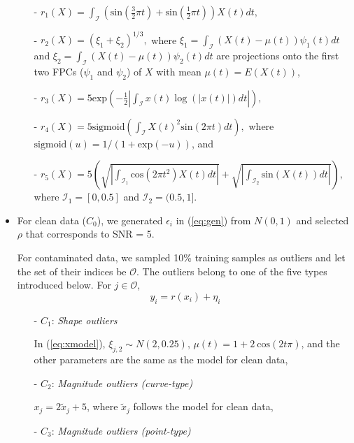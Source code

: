 \documentclass{article}
\let\oldref\ref
\renewcommand{\ref}[1]{(\oldref{#1})}
\begin{document}
\begin{itemize}
\begin{itemize}
\item[- ]  $r_1(X) =  \int_{\mathcal{I}} \left (\text{sin} \left(\frac{3}{2} \pi t \right) +  \text{sin} \left(\frac{1}{2} \pi t \right)\right)X(t)dt,$
\item[- ]  $r_2(X) = (\xi_1 + \xi_2)^{1/3},$ where  $\xi_1 = \int_{\mathcal{I}} (X(t) - \mu(t))\psi_1(t) dt$ and $\xi_2 = \int_{\mathcal{I}} (X(t) - \mu(t))\psi_2(t) dt$ are projections onto the first two FPCs ($\psi_1$ and $\psi_2$) of $X$ with mean $\mu(t) = E(X(t))$, 
\item[- ]  $r_3(X) = 5\text{exp}\left (- \frac{1}{2}\left| \int_{\mathcal{I}} x(t)\log(|x(t)|)dt \right| \right),$
\item[- ] 
$r_4(X) = 5\text{sigmoid}\left(\int_{\mathcal{I}}X(t)^2 \text{sin}(2\pi t) dt \right),$ where  $\text{sigmoid}(u) = 1/(1+ \text{exp}(-u))$, and
\item[- ] 
$r_5(X) = 5 \left( \sqrt{\left|\int_{\mathcal{I}_1} \text{cos}(2\pi t^2) X(t) dt \right|} + \sqrt{\left|\int_{\mathcal{I}_2} \text{sin}(X(t)) dt \right|} \right), $ where  $\mathcal{I}_1 = [0,0.5]$ and $\mathcal{I}_2 = (0.5,1]$. 
\end{itemize}

\item For clean data ($C_0$), we generated $\epsilon_i$ in \ref{eq:gen} from $N(0,1)$ and selected $\rho$ that corresponds to SNR = 5. 

For contaminated data, we sampled 10\% training samples as outliers and let the set of their indices be $\mathcal{O}$. The outliers belong to  one of the five types introduced below. For $j \in \mathcal{O}$, 
$$y_i = r(x_i) + \eta_i$$
\begin{itemize}
    \item[- ] $C_1$: \textit{Shape outliers}
    
    \vspace{1ex}
    In \ref{eq:xmodel},   $\xi_{j,2} \sim N(2, 0.25)$, $\mu(t) = 1 + 2\ \text{cos}(2t\pi)$, and the other parameters are the same as the model for clean data,
    \vspace{1ex}
    \item[- ] $C_2$: \textit{Magnitude outliers (curve-type)}     \vspace{1ex}
    
    $x_{j} = 2 \tilde{x}_{j} + 5$, where $\tilde{x}_j$ follows the model for clean data,
       \vspace{1ex}
    \item[- ] $C_3$: \textit{Magnitude outliers (point-type)}
    

\end{itemize}
\end{itemize}
\end{document}
